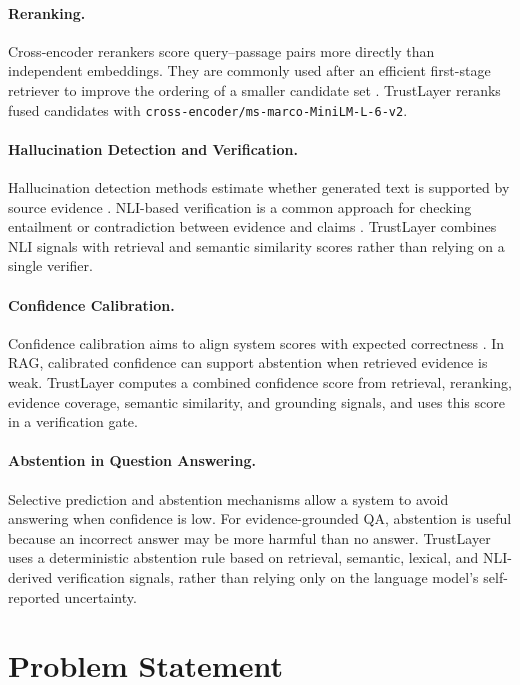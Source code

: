 \documentclass[11pt]{article}
\begin{document}
\paragraph{Reranking.}
Cross-encoder rerankers score query--passage pairs more directly than independent embeddings. They are commonly used after an efficient first-stage retriever to improve the ordering of a smaller candidate set \citep{nogueira2019passage}. TrustLayer reranks fused candidates with \texttt{cross-encoder/ms-marco-MiniLM-L-6-v2}.

\paragraph{Hallucination Detection and Verification.}
Hallucination detection methods estimate whether generated text is supported by source evidence \citep{ji2023survey}. NLI-based verification is a common approach for checking entailment or contradiction between evidence and claims \citep{thorne2018fever}. TrustLayer combines NLI signals with retrieval and semantic similarity scores rather than relying on a single verifier.

\paragraph{Confidence Calibration.}
Confidence calibration aims to align system scores with expected correctness \citep{guo2017calibration}. In RAG, calibrated confidence can support abstention when retrieved evidence is weak. TrustLayer computes a combined confidence score from retrieval, reranking, evidence coverage, semantic similarity, and grounding signals, and uses this score in a verification gate.

\paragraph{Abstention in Question Answering.}
Selective prediction and abstention mechanisms allow a system to avoid answering when confidence is low. For evidence-grounded QA, abstention is useful because an incorrect answer may be more harmful than no answer. TrustLayer uses a deterministic abstention rule based on retrieval, semantic, lexical, and NLI-derived verification signals, rather than relying only on the language model's self-reported uncertainty.

\section{Problem Statement}
\end{document}
